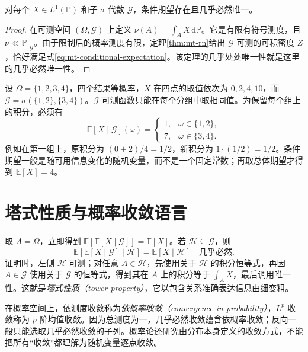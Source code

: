 \begin{theorem}[条件期望的存在与唯一性]
对每个 $X\in L^1(\mathbb P)$ 和子 $\sigma$ 代数 $\mathcal G$，条件期望存在且几乎必然唯一。
\end{theorem}
\begin{proof}
在可测空间 $(\Omega,\mathcal G)$ 上定义 $\nu(A)=\int_AX\,\mathrm d\mathbb P$。它是有限有符号测度，且 $\nu\ll\mathbb P|_{\mathcal G}$。由于限制后的概率测度有限，定理\ref{thm:mt-rn}给出 $\mathcal G$ 可测的可积密度 $Z$，恰好满足式\eqref{eq:mt-conditional-expectation}。该定理的几乎处处唯一性就是这里的几乎必然唯一性。
\end{proof}

\begin{example}[有限分割上的条件平均]
设 $\Omega=\{1,2,3,4\}$，四个结果等概率，$X$ 在四点的取值依次为 $0,2,4,10$，而 $\mathcal G=\sigma(\{1,2\},\{3,4\})$。$\mathcal G$ 可测函数只能在每个分组中取相同值。为保留每个组上的积分，必须有
\[
 \mathbb E[X\mid\mathcal G](\omega)=
 \begin{cases}
  1,&\omega\in\{1,2\},\\
  7,&\omega\in\{3,4\}.
 \end{cases}
\]
例如在第一组上，原积分为 $(0+2)/4=1/2$，新积分为 $1\cdot(1/2)=1/2$。条件期望一般是随可用信息变化的随机变量，而不是一个固定常数；再取总体期望才得到 $\mathbb E[X]=4$。
\end{example}

\section{塔式性质与概率收敛语言}
取 $A=\Omega$，立即得到 $\mathbb E[\mathbb E[X\mid\mathcal G]]=\mathbb E[X]$。若 $\mathcal H\subseteq\mathcal G$，则
\begin{equation}
 \mathbb E[\mathbb E[X\mid\mathcal G]\mid\mathcal H]
 =\mathbb E[X\mid\mathcal H]\quad\text{几乎必然}.
 \label{eq:mt-tower}
\end{equation}
证明时，左侧 $\mathcal H$ 可测；对任意 $A\in\mathcal H$，先使用关于 $\mathcal H$ 的积分恒等式，再因 $A\in\mathcal G$ 使用关于 $\mathcal G$ 的恒等式，得到其在 $A$ 上的积分等于 $\int_AX$，最后调用唯一性。这就是\emph{塔式性质（tower property）}，它以包含关系准确表达信息由细变粗。

在概率空间上，依测度收敛称为\emph{依概率收敛（convergence in probability）}，$L^p$ 收敛称为 $p$ 阶均值收敛。因为总测度为一，几乎必然收敛蕴含依概率收敛；反向一般只能选取几乎必然收敛的子列。概率论还研究由分布本身定义的收敛方式，不能把所有“收敛”都理解为随机变量逐点收敛。

